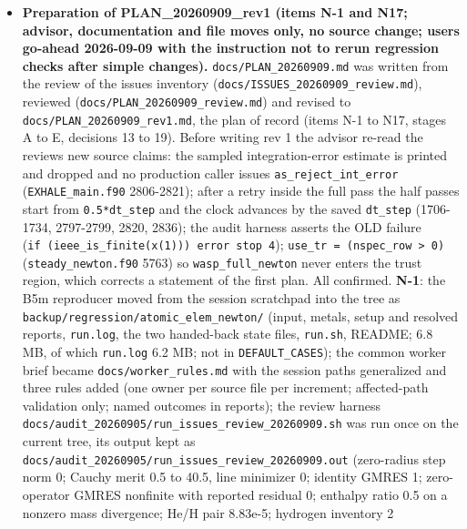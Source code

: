 \documentclass[english,a4paper]{my_memo}
\begin{document}
\begin{itemize}
{  not bounds and not subspace.} Per the user\textquotesingle s instruction of 2026-09-09
  ("leave running things alone, stop code modification for now") no
  further item is started; B5m (the atomic element-row solve with no Krylov
  direction) stays planned.
\item
  \textbf{Preparation of PLAN\_20260909\_rev1 (items N-1 and N17; advisor,
  documentation and file moves only, no source change; user\textquotesingle s go-ahead
  2026-09-09 with the instruction not to rerun regression checks after
  simple changes).} \texttt{docs/PLAN\_20260909.md} was written from the review of
  the issues inventory (\texttt{docs/ISSUES\_20260909\_review.md}), reviewed
  (\texttt{docs/PLAN\_20260909\_review.md}) and revised to \texttt{docs/PLAN\_20260909\_rev1.md},
  the plan of record (items N-1 to N17, stages A to E, decisions 13 to 19).
  Before writing rev 1 the advisor re-read the review\textquotesingle s new source claims:
  the sampled integration-error estimate is printed and dropped and no
  production caller issues \texttt{as\_reject\_int\_error} (\texttt{EXHALE\_main.f90}
  2806-2821); after a retry inside the full pass the half passes start from
  \texttt{0.5*dt\_step} and the clock advances by the saved \texttt{dt\_step} (1706-1734,
  2797-2799, 2820, 2836); the audit harness asserts the OLD failure
  (\texttt{if\ (ieee\_is\_finite(x(1)))\ error\ stop\ 4}); \texttt{use\_tr\ =\ (nspec\_row\ \textgreater{}\ 0)}
  (\texttt{steady\_newton.f90} 5763) so \texttt{wasp\_full\_newton} never enters the trust
  region, which corrects a statement of the first plan. All confirmed. \textbf{N-1}:
  the B5m reproducer moved from the session scratchpad into the tree as
  \texttt{backup/regression/atomic\_elem\_newton/} (input, metals, setup and resolved
  reports, \texttt{run.log}, the two handed-back state files, \texttt{run.sh}, README;
  6.8 MB, of which \texttt{run.log} 6.2 MB; not in \texttt{DEFAULT\_CASES}); the common
  worker brief became \texttt{docs/worker\_rules.md} with the session paths
  generalized and three rules added (one owner per source file per
  increment; affected-path validation only; named outcomes in reports); the
  review harness \texttt{docs/audit\_20260905/run\_issues\_review\_20260909.sh} was run
  once on the current tree, its output kept as
  \texttt{docs/audit\_20260905/run\_issues\_review\_20260909.out} (zero-radius step
  norm 0; Cauchy merit 0.5 to 40.5, line minimizer 0; identity GMRES 1;
  zero-operator GMRES nonfinite with reported residual 0; enthalpy ratio
  0.5 on a nonzero mass divergence; He/H pair 8.83e-5; hydrogen inventory 2

\end{itemize}
\end{document}
